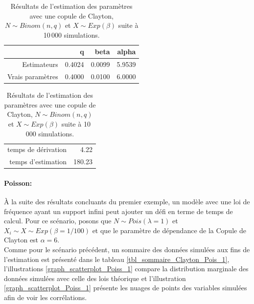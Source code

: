 \documentclass{article}
\begin{document}
	\begin{table}[H]
		\centering
		\begin{tabular}{rrrr}
			\hline
			& q & beta & alpha \\ 
			\hline
			Estimateurs & 0.4024 & 0.0099 & 5.9539 \\ 
			Vrais paramètres & 0.4000 & 0.0100 & 6.0000 \\ 
			\hline
		\end{tabular}
		\begin{tabular}{rr}
			\hline
			&  \\ 
			\hline
			temps de dérivation & 4.22 \\ 
			temps d'estimation & 180.23 \\ 
			\hline
		\end{tabular}
		\caption[Estimations avec une copule de Clayton et $N\sim Binomiale$]{Résultats de l'estimation des paramètres avec une copule de Clayton, $N\sim Binom(n,q)$ et $X \sim Exp(\beta)$ suite à 10\,000 simulations.} 
		\label{tbl_Clayton_Binom}
	\end{table}
	
	\paragraph{Poisson:} À la suite des résultats concluants du premier exemple, un modèle avec une loi de fréquence ayant un support infini peut ajouter un défi en terme de temps de calcul. Pour ce scénario, posons que $N \sim Pois(\lambda=1)$ et $X_i \sim X \sim Exp(\beta=1/100)$ et que le paramètre de dépendance de la Copule de Clayton est $\alpha = 6$. \\
	
	Comme pour le scénario précédent, un sommaire des données simulées aux fins de l'estimation est présenté dans le tableau \ref{tbl_sommaire_Clayton_Pois_1}, l'illustrations \ref{graph_scatterplot_Poiss_1} compare la distribution marginale des données simulées avec celle des lois théorique et l'illustration \ref{graph_scatterplot_Poiss_1} présente les nuages de points des variables simulées afin de voir les corrélations.
	
\end{document}
